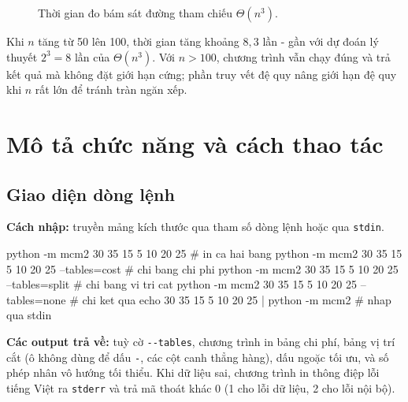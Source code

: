 \documentclass[12pt,a4paper]{article}
\begin{document}
\begin{figure}[H]
\centering
{}
\caption{Thời gian đo bám sát đường tham chiếu $\Theta(n^3)$.}
\end{figure}

Khi $n$ tăng từ 50 lên 100, thời gian tăng khoảng $8{,}3$ lần - gần với dự đoán lý thuyết $2^3 = 8$ lần của $\Theta(n^3)$. Với $n > 100$, chương trình vẫn chạy đúng và trả kết quả mà không đặt giới hạn cứng; phần truy vết đệ quy nâng giới hạn đệ quy khi $n$ rất lớn để tránh tràn ngăn xếp.

\section{Mô tả chức năng và cách thao tác}

\subsection{Giao diện dòng lệnh}
\textbf{Cách nhập:} truyền mảng kích thước qua tham số dòng lệnh hoặc qua \texttt{stdin}.
\begin{VOutput}
python -m mcm2 30 35 15 5 10 20 25                  # in ca hai bang
python -m mcm2 30 35 15 5 10 20 25 --tables=cost    # chi bang chi phi
python -m mcm2 30 35 15 5 10 20 25 --tables=split   # chi bang vi tri cat
python -m mcm2 30 35 15 5 10 20 25 --tables=none    # chi ket qua
echo 30 35 15 5 10 20 25 | python -m mcm2           # nhap qua stdin
\end{VOutput}
\textbf{Các output trả về:} tuỳ cờ \texttt{-{}-tables}, chương trình in bảng chi phí, bảng vị trí cắt (ô không dùng để dấu \texttt{-}, các cột canh thẳng hàng), dấu ngoặc tối ưu, và số phép nhân vô hướng tối thiểu. Khi dữ liệu sai, chương trình in thông điệp lỗi tiếng Việt ra \texttt{stderr} và trả mã thoát khác 0 (1 cho lỗi dữ liệu, 2 cho lỗi nội bộ).
\end{document}
